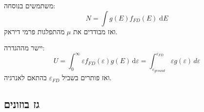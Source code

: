 \documentclass{tstextbook}
\begin{document}
\begin{proposition}
משתמשים בנוסחה:
$$N=\int g\left( E \right)f_{FD}\left( E \right) \;\mathrm{d} E $$
ואז מבודדים את \(\mu\) מהתפלגות פרמי דיראק.

\end{proposition}
\begin{proposition}
יישר מההגדרה:
$$U=\int_{0}^{\infty}  \varepsilon f_{FD}\left( \varepsilon \right)g(E)\, \mathrm{d}\varepsilon= \int_{\varepsilon_{ground}}^{\varepsilon_{FD}}\varepsilon g\left( \varepsilon \right)  \, d\varepsilon  $$
ואז פותרים בשביל \(\varepsilon_{FD}\) בהתאם לאנרגיה.

\end{proposition}
\subsection{גז בוזונים}
\end{document}
